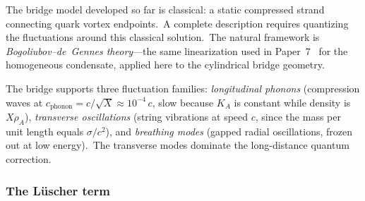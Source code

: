 ﻿\documentclass[12pt,letterpaper]{article}
\newcommand{\rhoa}{\rho_{\!A}}
\newcommand{\Ka}{K_{\!A}}
\begin{document}
The bridge model developed so far is classical: a static compressed strand
connecting quark vortex endpoints.\ A complete description requires
quantizing the fluctuations around this classical solution.\ The natural
framework is \emph{Bogoliubov--de~Gennes theory}---the same linearization
used in Paper~7~\cite{otto-quantum} for the homogeneous condensate, applied here
to the cylindrical bridge geometry.

The bridge supports three fluctuation families: \emph{longitudinal
phonons} (compression waves at $c_{\mathrm{phonon}} = c/\sqrt{X} \approx
10^{-4}\,c$, slow because $\Ka$ is constant while density is $X\rhoa$),
\emph{transverse oscillations} (string vibrations at speed $c$, since the
mass per unit length equals $\sigma/c^2$), and \emph{breathing modes}
(gapped radial oscillations, frozen out at low energy).\ The transverse
modes dominate the long-distance quantum correction.

\subsubsection*{The L\"uscher term}
\end{document}

